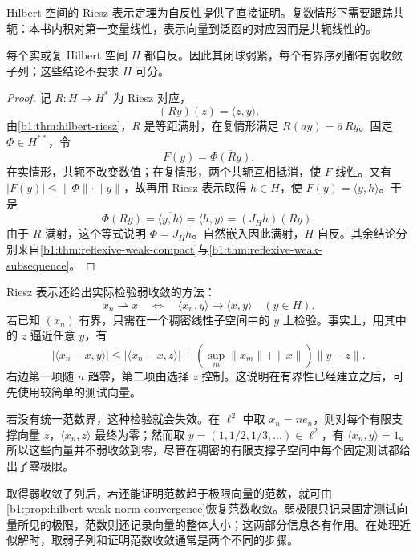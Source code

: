 Hilbert 空间的 Riesz 表示定理为自反性提供了直接证明。复数情形下需要跟踪共轭：本书内积对第一变量线性，表示向量到泛函的对应因而是共轭线性的。

\begin{corollary}\label{b1:cor:hilbert-reflexive}
每个实或复 Hilbert 空间 \(H\) 都自反。因此其闭球弱紧，每个有界序列都有弱收敛子列；这些结论不要求 \(H\) 可分。
\end{corollary}
\begin{proof}
记 \(R:H\rightarrow H^*\) 为 Riesz 对应，
\[
 (Ry)(z)=\langle z,y\rangle.
\]
由\cref{b1:thm:hilbert-riesz}，\(R\) 是等距满射，在复情形满足 \(R(ay)=\overline a\,Ry\)。固定 \(\Phi\in H^{**}\)，令
\[
 F(y)=\overline{\Phi(Ry)}.
\]
在实情形，共轭不改变数值；在复情形，两个共轭互相抵消，使 \(F\) 线性。又有 \(|F(y)|\le\|\Phi\|\cdot\|y\|\)，故再用 Riesz 表示取得 \(h\in H\)，使 \(F(y)=\langle y,h\rangle\)。于是
\[
 \Phi(Ry)=\overline{\langle y,h\rangle}
 =\langle h,y\rangle=(J_Hh)(Ry).
\]
由于 \(R\) 满射，这个等式说明 \(\Phi=J_Hh\)。自然嵌入因此满射，\(H\) 自反。其余结论分别来自\cref{b1:thm:reflexive-weak-compact}与\cref{b1:thm:reflexive-weak-subsequence}。
\end{proof}

Riesz 表示还给出实际检验弱收敛的方法：
\[
 x_n\rightharpoonup x
 \quad\Longleftrightarrow\quad
 \langle x_n,y\rangle\longrightarrow\langle x,y\rangle
 \quad(y\in H).
\]
若已知 \((x_n)\) 有界，只需在一个稠密线性子空间中的 \(y\) 上检验。事实上，用其中的 \(z\) 逼近任意 \(y\)，有
\[
 |\langle x_n-x,y\rangle|
 \le|\langle x_n-x,z\rangle|
   +(\sup_m\|x_m\|+\|x\|)\|y-z\|.
\]
右边第一项随 \(n\) 趋零，第二项由选择 \(z\) 控制。这说明在有界性已经建立之后，可先使用较简单的测试向量。

\ProseParagraphBreak

若没有统一范数界，这种检验就会失效。在 \(\ell^2\) 中取 \(x_n=ne_n\)，则对每个有限支撑向量 \(z\)，\(\langle x_n,z\rangle\) 最终为零；然而取 \(y=(1,1/2,1/3,\ldots)\in\ell^2\)，有 \(\langle x_n,y\rangle=1\)。所以这些向量并不弱收敛到零，尽管在稠密的有限支撑子空间中每个固定测试都给出了零极限。

\ProseParagraphBreak

取得弱收敛子列后，若还能证明范数趋于极限向量的范数，就可由\cref{b1:prop:hilbert-weak-norm-convergence}恢复范数收敛。弱极限只记录固定测试向量所见的极限，范数则还记录向量的整体大小；这两部分信息各有作用。在处理近似解时，取弱子列和证明范数收敛通常是两个不同的步骤。


